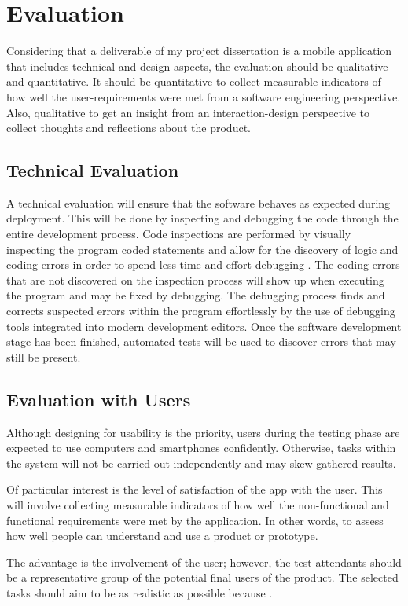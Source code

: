 \section{Evaluation}
Considering that a deliverable of my project dissertation is a mobile application that includes technical and design aspects, the evaluation should be qualitative and quantitative. It should be quantitative to collect measurable indicators of how well the user-requirements were met from a software engineering perspective. Also, qualitative to get an insight from an interaction-design perspective to collect thoughts and reflections about the product.

\subsection{Technical Evaluation}
A technical evaluation will ensure that the software behaves as expected during deployment. This will be done by inspecting and debugging the code through the entire development process. Code inspections are performed by visually inspecting the program coded statements and allow for the discovery of logic and coding errors in order to spend less time and effort debugging \cite{Myers2011}. The coding errors that are not discovered on the inspection process will show up when executing the program and may be fixed by debugging. The debugging process finds and corrects suspected errors within the program effortlessly by the use of debugging tools integrated into modern development editors. Once the software development stage has been finished, automated tests will be used to discover errors that may still be present.

\subsection{Evaluation with Users}
Although designing for usability is the priority, users during the testing phase are expected to use computers and smartphones confidently. Otherwise, tasks within the system will not be carried out independently and may skew gathered results. 

Of particular interest is the level of satisfaction of the app with the user. This will involve collecting measurable indicators of how well the non-functional and functional requirements were met by the application. In other words, to assess how well people can understand and use a product or prototype.

 \cite{Scholtz2003} The advantage is the involvement of the user; however, the test attendants should be a representative group of the potential final users of the product. The selected tasks should aim to be as realistic as possible because  \cite{Scholtz2003}.

